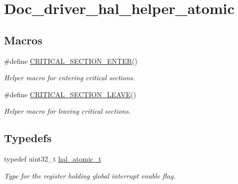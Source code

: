 \hypertarget{group__doc__driver__hal__helper__atomic}{}\section{Doc\+\_\+driver\+\_\+hal\+\_\+helper\+\_\+atomic}
\label{group__doc__driver__hal__helper__atomic}
\subsection*{Macros}
\begin{DoxyCompactItemize}
\item 
\#define \hyperlink{group__doc__driver__hal__helper__atomic_ga039bfe712b6ba4388a35672f54763391}{C\+R\+I\+T\+I\+C\+A\+L\+\_\+\+S\+E\+C\+T\+I\+O\+N\+\_\+\+E\+N\+T\+ER}()
\begin{DoxyCompactList}\small\item\em Helper macro for entering critical sections. \end{DoxyCompactList}\item 
\#define \hyperlink{group__doc__driver__hal__helper__atomic_ga6b32c9f95e7c6b604d621e215c514015}{C\+R\+I\+T\+I\+C\+A\+L\+\_\+\+S\+E\+C\+T\+I\+O\+N\+\_\+\+L\+E\+A\+VE}()
\begin{DoxyCompactList}\small\item\em Helper macro for leaving critical sections. \end{DoxyCompactList}\end{DoxyCompactItemize}
\subsection*{Typedefs}
\begin{DoxyCompactItemize}
\item 
typedef uint32\+\_\+t \hyperlink{group__doc__driver__hal__helper__atomic_ga6b3a0c9eea25111ac1877e0302e2fe1c}{hal\+\_\+atomic\+\_\+t}
\begin{DoxyCompactList}\small\item\em Type for the register holding global interrupt enable flag. \end{DoxyCompactList}\end{DoxyCompactItemize}
